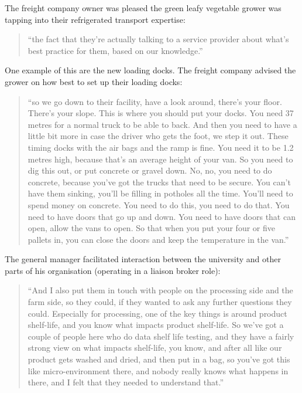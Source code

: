 The freight company owner was pleased the green leafy vegetable grower was tapping into their refrigerated transport expertise:

\begin{quote}
\small
\enquote{the fact that they’re actually talking to a service provider about what's best practice for them, based on our knowledge.} \\
\end{quote}

One example of this are the new loading docks. The freight company advised the grower on how best to set up their loading docks: 

\begin{quote}
\small
\enquote{so we go down to their facility, have a look around, there's your floor. There's your slope. This is where you should put your docks. You need 37 metres for a normal truck to be able to back. And then you need to have a little bit more in case the driver who gets the foot, we step it out. These timing docks with the air bags and the ramp is fine. You need it to be 1.2 metres high, because that’s an average height of your van. So you need to dig this out, or put concrete or gravel down. No, no, you need to do concrete, because you've got the trucks that need to be secure. You can't have them sinking, you'll be filling in potholes all the time. You'll need to spend money on concrete. You need to do this, you need to do that. You need to have doors that go up and down. You need to have doors that can open, allow the vans to open. So that when you put your four or five pallets in, you can close the doors and keep the temperature in the van.} \\
\end{quote}

The general manager facilitated interaction between the university and other parts of his organisation (operating in a liaison broker role):

\begin{quote}
\small
\enquote{And I also put them in touch with people on the processing side and the farm side, so they could, if they wanted to ask any further questions they could. Especially for processing, one of the key things is around product shelf-life, and you know what impacts product shelf-life. So we've got a couple of people here who do data shelf life testing, and they have a fairly strong view on what impacts shelf-life, you know, and after all like our product gets washed and dried, and then put in a bag, so you've got this like micro-environment there, and nobody really knows what happens in there, and I felt that they needed to understand that.} \\
\end{quote}


